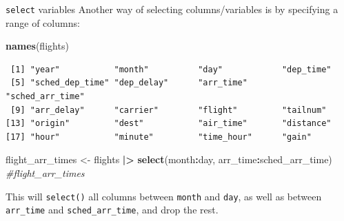 \documentclass[
  ignorenonframetext,
]{beamer}
\newenvironment{Shaded}{\begin{snugshade}}{\end{snugshade}}
\newcommand{\CommentTok}[1]{\textcolor[rgb]{0.56,0.35,0.01}{\textit{#1}}}
\newcommand{\FunctionTok}[1]{\textcolor[rgb]{0.13,0.29,0.53}{\textbf{#1}}}
\newcommand{\NormalTok}[1]{#1}
\newcommand{\OtherTok}[1]{\textcolor[rgb]{0.56,0.35,0.01}{#1}}
\newcommand{\SpecialCharTok}[1]{\textcolor[rgb]{0.81,0.36,0.00}{\textbf{#1}}}
\begin{document}
\begin{frame}[fragile]{\texttt{select} variables}
\label{select-variables-2}
Another way of selecting columns/variables is by specifying a range of
columns:

\small

\begin{Shaded}
\begin{Highlighting}[]
\FunctionTok{names}\NormalTok{(flights)}
\end{Highlighting}
\end{Shaded}

\begin{verbatim}
 [1] "year"           "month"          "day"            "dep_time"      
 [5] "sched_dep_time" "dep_delay"      "arr_time"       "sched_arr_time"
 [9] "arr_delay"      "carrier"        "flight"         "tailnum"       
[13] "origin"         "dest"           "air_time"       "distance"      
[17] "hour"           "minute"         "time_hour"      "gain"          
\end{verbatim}

\begin{Shaded}
\begin{Highlighting}[]
\NormalTok{flight\_arr\_times }\OtherTok{\textless{}{-}}\NormalTok{ flights }\SpecialCharTok{|\textgreater{}} 
  \FunctionTok{select}\NormalTok{(month}\SpecialCharTok{:}\NormalTok{day, arr\_time}\SpecialCharTok{:}\NormalTok{sched\_arr\_time)}
\CommentTok{\#flight\_arr\_times}
\end{Highlighting}
\end{Shaded}

\normalsize

This will \texttt{select()} all columns between \texttt{month} and
\texttt{day}, as well as between \texttt{arr\_time} and
\texttt{sched\_arr\_time}, and drop the rest.
\end{frame}
\end{document}
